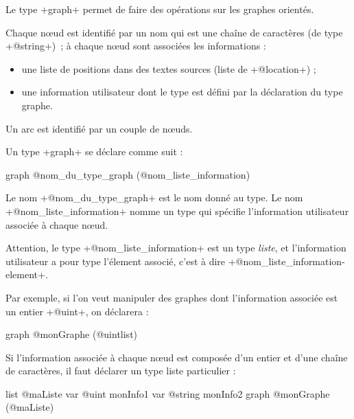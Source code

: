 



Le type \ggst+graph+ permet de faire des opérations sur les graphes orientés.

Chaque nœud est identifié par un nom qui est une chaîne de caractères (de type \ggst+@string+)~; à chaque nœud sont associées les informations :
\begin{itemize}
  \item une liste de positions dans des textes sources (liste de \ggst+@location+) ;
  \item une information utilisateur dont le type est défini par la déclaration du type graphe.
\end{itemize}

Un arc est identifié par un couple de nœuds.


Un type \ggst+graph+ se déclare comme suit :
\begin{galgas3}
graph @nom_du_type_graph (@nom_liste_information) {
}
\end{galgas3}

Le nom \ggst+@nom_du_type_graph+ est le nom donné au type. Le nom \ggst+@nom_liste_information+ nomme un type qui spécifie l'information utilisateur associée à chaque nœud.

Attention, le type \ggst+@nom_liste_information+ est un type \emph{liste}, et l'information utilisateur a pour type l'élement associé, c'est à dire \ggst+@nom_liste_information-element+.

Par exemple, si l'on veut manipuler des graphes dont l'information associée est un entier \ggst+@uint+, on déclarera :
\begin{galgas3}
graph @monGraphe (@uintlist) {
}
\end{galgas3}

Si l'information associée à chaque nœud est composée d'un entier et d'une chaîne de caractères, il faut déclarer un type liste particulier :
\begin{galgas3}
list @maListe {
  var @uint monInfo1
  var @string monInfo2
}
graph @monGraphe (@maListe) {
}
\end{galgas3}






